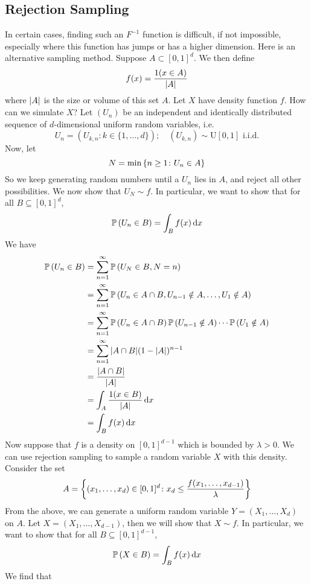 \subsection{Rejection Sampling}
In certain cases, finding such an $F^{-1}$ function is difficult, if not impossible, especially where this function has jumps or has a higher dimension. Here is an alternative sampling method. Suppose $A \subset [0, 1]^d$. We then define
\[ f(x) = \frac{1(x \in A)}{\abs{A}} \]
where $\abs{A}$ is the size or volume of this set $A$. Let $X$ have density function $f$. How can we simulate $X$? Let $(U_n)$ be an independent and identically distributed sequence of $d$-dimensional uniform random variables, i.e.
\[ U_n = (U_{k, n} \colon k \in \{ 1, \dots, d \});\quad (U_{k, n}) \sim \mathrm{U}[0, 1] \text{ i.i.d.} \]
Now, let
\[ N = \min\qty{n \geq 1 \colon U_n \in A} \]
So we keep generating random numbers until a $U_n$ lies in $A$, and reject all other possibilities. We now show that $U_N \sim f$. In particular, we want to show that for all $B \subseteq [0, 1]^d$,
\[ \mathbb{P}\left({U_n \in B}\right) = \int_B f(x) \dd{x} \]
We have
\begin{align*}
    \mathbb{P}\left({U_n \in B}\right) &= \sum_{n=1}^\infty \mathbb{P}\left({U_N \in B, N = n}\right) \\
    &= \sum_{n=1}^\infty \mathbb{P}\left({U_n \in A \cap B, U_{n-1} \notin A, \dots, U_1 \notin A}\right) \\
    &= \sum_{n=1}^\infty \mathbb{P}\left({U_n \in A \cap B}\right) \mathbb{P}\left({U_{n-1} \notin A}\right) \cdots \mathbb{P}\left({U_1 \notin A}\right) \\
    &= \sum_{n=1}^\infty \abs{A \cap B} (1 -\abs{A})^{n-1} \\
    &= \frac{\abs{A \cap B}}{\abs{A}} \\
    &= \int_A \frac{1(x \in B)}{\abs{A}} \dd{x} \\
    &= \int_B f(x) \dd{x}
\end{align*}
Now suppose that $f$ is a density on $[0, 1]^{d-1}$ which is bounded by $\lambda > 0$. We can use rejection sampling to sample a random variable $X$ with this density. Consider the set
\[ A = \qty{(x_1, \dots, x_d) \in [0, 1]^d \colon x_d \leq \frac{f(x_1, \dots, x_{d-1})}{\lambda}} \]
From the above, we can generate a uniform random variable $Y = (X_1, \dots, X_d)$ on $A$. Let $X = (X_1, \dots, X_{d-1})$, then we will show that $X \sim f$. In particular, we want to show that for all $B \subseteq [0, 1]^{d-1}$,
\[ \mathbb{P}\left({X \in B}\right) = \int_B f(x) \dd{x} \]
We find that
